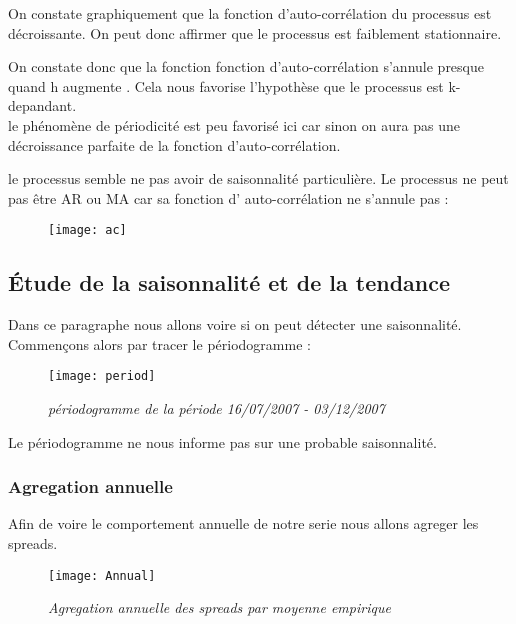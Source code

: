    On constate graphiquement que la fonction d'auto-corrélation du processus est décroissante. On peut donc affirmer
    que le processus est faiblement stationnaire.

    On constate donc que la fonction fonction d'auto-corrélation s'annule presque quand h augmente
    . Cela nous favorise l'hypothèse que le processus est k-depandant. \\
    le phénomène de périodicité est peu favorisé ici car sinon on aura pas une décroissance parfaite de 
    la fonction d'auto-corrélation.

    le processus semble ne pas avoir de saisonnalité particulière.
    Le processus ne peut pas être AR ou MA car sa fonction d' auto-corrélation ne s'annule pas :
    \begin{figure}[H]
        \begin{center}
            \texttt{[image: ac]} 
        \end{center}
        \caption{}
        \label{fig:cor}
    \end{figure}

    \subsection{Étude de la saisonnalité et de la tendance}

    Dans ce paragraphe nous allons voire si on peut détecter une saisonnalité.
    Commençons alors par tracer le périodogramme :
    \begin{figure}[H]
        \centering 
        \label{fig:period} 
        \texttt{[image: period]} 
        \caption{\it périodogramme de la période 16/07/2007 - 03/12/2007 } 
    \end{figure} 

    Le périodogramme ne nous informe pas sur une probable saisonnalité.
    \subsubsection{Agregation annuelle}
    Afin de voire le comportement annuelle de notre serie nous allons agreger
    les spreads. 
    \begin{figure}[H]
        \centering 
        \label{fig:annual} 
        \texttt{[image: Annual]} 
        \caption{\it Agregation annuelle des spreads par moyenne empirique } 
    \end{figure} 

